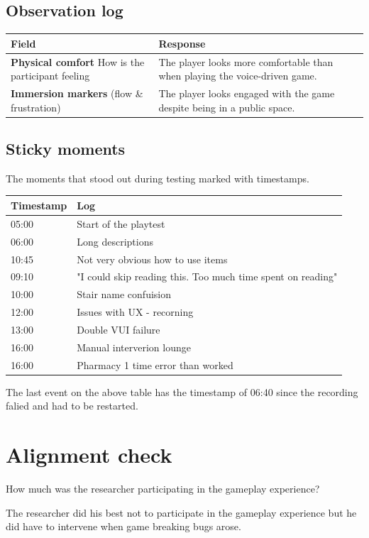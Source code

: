 \subsection{Observation log}
\begin{table}[h]
\centering
\begin{tabular}{|p{5cm}|p{10cm}|}
\hline
\textbf{Field} & \textbf{Response} \\ \hline
\textbf{Physical comfort} How is the participant feeling & The player looks more comfortable than when playing the voice-driven game. \\[1.5cm] \hline
\textbf{Immersion markers} (flow \& frustration) & The player looks engaged with the game despite being in a public space.\\[1.5cm] \hline
\end{tabular}
\end{table}


\subsection{Sticky moments}
The moments that stood out during testing marked with timestamps.
\begin{table}[h]
\centering
\begin{tabular}{|p{3cm}|p{10cm}|}
\hline
\textbf{Timestamp} & \textbf{Log} \\ \hline
05:00 & Start of the playtest \\ \hline 
06:00 & Long descriptions \\ \hline 
10:45 & Not very obvious how to use items \\ \hline 
09:10 & "I could skip reading this. Too much time spent on reading" \\ \hline 
10:00 & Stair name confuision \\ \hline 
12:00 & Issues with UX - recorning \\ \hline 
13:00 & Double VUI failure \\ \hline 
16:00 & Manual interverion lounge \\ \hline 
16:00 & Pharmacy 1 time error than worked \\ \hline 
\end{tabular}
\end{table}

The last event on the above table has the timestamp of 06:40 since the recording falied and had to be restarted.


\section{Alignment check}
How much was the researcher participating in the gameplay experience? 

The researcher did his best not to participate in the gameplay experience but he did have to intervene when game breaking bugs arose.



